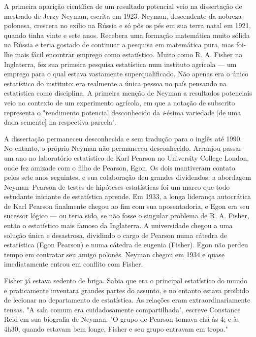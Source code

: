 \documentclass[11pt,a5paper,twoside]{book}
\begin{document}
A primeira aparição científica de um resultado potencial veio na dissertação de mestrado de Jerzy Neyman, escrita em 1923. Neyman, descendente da nobreza polonesa, crescera no exílio na Rússia e só pôs os pés em sua terra natal em 1921, quando tinha vinte e sete anos. Recebera uma formação matemática muito sólida na Rússia e teria gostado de continuar a pesquisa em matemática pura, mas foi-lhe mais fácil encontrar emprego como estatístico. Muito como R. A. Fisher na Inglaterra, fez sua primeira pesquisa estatística num instituto agrícola — um emprego para o qual estava vastamente superqualificado. Não apenas era o único estatístico do instituto: era realmente a única pessoa no país pensando na estatística como disciplina. A primeira menção de Neyman a resultados potenciais veio no contexto de um experimento agrícola, em que a notação de subscrito representa o "rendimento potencial desconhecido da \textit{i}-ésima variedade [de uma dada semente] na respectiva parcela".

A dissertação permaneceu desconhecida e sem tradução para o inglês até 1990. No entanto, o próprio Neyman não permaneceu desconhecido. Arranjou passar um ano no laboratório estatístico de Karl Pearson no University College London, onde fez amizade com o filho de Pearson, Egon. Os dois mantiveram contato pelos sete anos seguintes, e sua colaboração deu grandes dividendos: a abordagem Neyman–Pearson de testes de hipóteses estatísticas foi um marco que todo estudante iniciante de estatística aprende. Em 1933, a longa liderança autocrática de Karl Pearson finalmente chegou ao fim com sua aposentadoria, e Egon era seu sucessor lógico — ou teria sido, se não fosse o singular problema de R. A. Fisher, então o estatístico mais famoso da Inglaterra. A universidade chegou a uma solução única e desastrosa, dividindo o cargo de Pearson numa cátedra de estatística (Egon Pearson) e numa cátedra de eugenia (Fisher). Egon não perdeu tempo em contratar seu amigo polonês. Neyman chegou em 1934 e quase imediatamente entrou em conflito com Fisher.

Fisher já estava sedento de briga. Sabia que era o principal estatístico do mundo e praticamente inventara grandes partes do assunto, e no entanto estava proibido de lecionar no departamento de estatística. As relações eram extraordinariamente tensas. "A sala comum era cuidadosamente compartilhada", escreve Constance Reid em sua biografia de Neyman. "O grupo de Pearson tomava chá às 4; e às 4h30, quando estavam bem longe, Fisher e seu grupo entravam em tropa."
\end{document}
